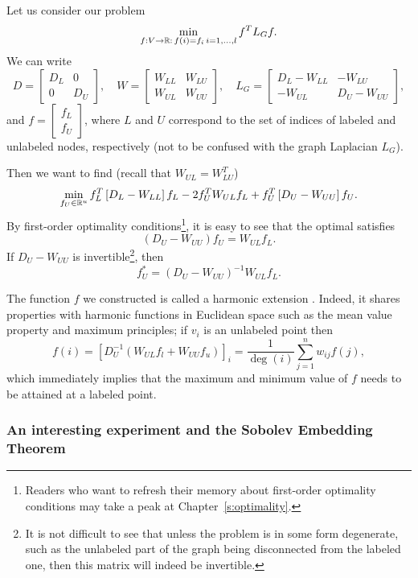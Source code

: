 Let us consider our problem
\[
 \min_{f:V\to \mathbb{R}:\, f(i)=f_i\, i=1,\dots,l} f^TL_G f.
\]
We can write
\[
 D = \left[ \begin{array}{cc} D_L & 0  \\  0  &  D_U  \end{array}  \right], \quad W = \left[ \begin{array}{cc} W_{LL} & W_{LU}  \\  W_{UL}  &  W_{UU}  \end{array}  \right], \quad L_G = \left[ \begin{array}{cc} D_L - W_{LL} & -W_{LU}  \\  -W_{UL}  & D_U - W_{UU}  \end{array}  \right], 
 \]
and $f =  \left[ \begin{array}{c} f_L   \\  f_U  \end{array}  \right]$, where $L$ and $U$ correspond to the set of indices of  labeled and unlabeled nodes, respectively (not to be confused with the graph Laplacian $L_G$). 
 
 
Then we want to find (recall that $W_{UL}=W_{LU}^T$)
\[
\min_{f_U\in \mathbb{R}^{u}} f_L^T\left[ D_L - W_{LL}\right] f_L - 2f_U^TW_{UL}f_L + f_U^T\left[ D_U - W_{UU}\right] f_U.
\]
By first-order optimality conditions\footnote{Readers who want to refresh their memory about first-order optimality conditions may take a peak at Chapter~\ref{s:optimality}.}, it is easy to see that the optimal satisfies
\[
 \left( D_U - W_{UU}\right) f_U = W_{UL}f_L.
\]
If $D_U-W_{UU}$ is invertible\footnote{It is not difficult to see that unless the problem is in some form degenerate, such as the unlabeled part of the graph being disconnected from the labeled one, then this matrix will indeed be invertible.}, then
\[
 f_U^\ast = \left( D_U - W_{UU}\right)^{-1}W_{UL}f_L.
\]

\begin{remark}
 The function $f$ we constructed is called a harmonic extension \cite{zhu2003semi}. Indeed, it shares properties with harmonic functions in Euclidean space such as the mean value property and maximum principles; if $v_i$ is an unlabeled point then
 \[
  f(i) = \left[ D_U^{-1} \left( W_{UL}f_l + W_{UU}f_u \right) \right]_i = \frac1{\deg(i)}\sum_{j=1}^n w_{ij}f(j),
 \]
which immediately implies that the maximum and minimum value of $f$ needs to be attained at a labeled point.
\end{remark}


\subsubsection{An interesting experiment and the Sobolev Embedding Theorem}

